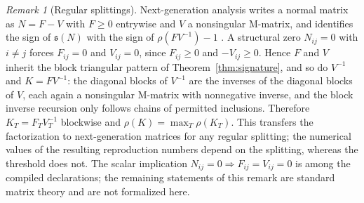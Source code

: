 \documentclass[11pt,a4paper]{article}
\theoremstyle{plain}
\theoremstyle{definition}
\theoremstyle{remark}
\newtheorem{remark}[theorem]{Remark}
\newcommand{\spb}{\mathfrak s}
\begin{document}
\begin{remark}[Regular splittings]\label{rem:splitting}
Next-generation analysis \citep{DiekmannHeesterbeekMetz1990,vandenDriesscheWatmough2002} writes a normal matrix as $N=F-V$ with $F\ge0$ entrywise and $V$ a nonsingular M-matrix, and identifies the sign of $\spb(N)$ with the sign of $\rho(FV^{-1})-1$ \citep{BermanPlemmons1994}. A structural zero $N_{ij}=0$ with $i\ne j$ forces $F_{ij}=0$ and $V_{ij}=0$, since $F_{ij}\ge0$ and $-V_{ij}\ge0$. Hence $F$ and $V$ inherit the block triangular pattern of Theorem~\ref{thm:signature}, and so do $V^{-1}$ and $K=FV^{-1}$: the diagonal blocks of $V^{-1}$ are the inverses of the diagonal blocks of $V$, each again a nonsingular M-matrix with nonnegative inverse, and the block inverse recursion only follows chains of permitted inclusions. Therefore $K_T=F_T V_T^{-1}$ blockwise and $\rho(K)=\max_T\rho(K_T)$. This transfers the factorization to next-generation matrices for any regular splitting; the numerical values of the resulting reproduction numbers depend on the splitting, whereas the threshold does not. The scalar implication $N_{ij}=0\Rightarrow F_{ij}=V_{ij}=0$ is among the compiled declarations; the remaining statements of this remark are standard matrix theory and are not formalized here.
\end{remark}
\end{document}
